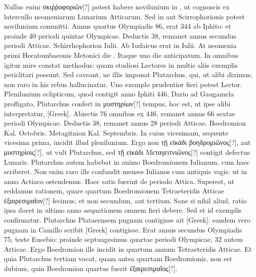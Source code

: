 Nullus enim \textgreek{σκιῤῥοφοριῶν[?]}
 potest habere novilunium in
, ut cognoscis ex latercullo neomeniarum Lunarium Atticarum.
Sed in  aut  Scirrophorionis potest
 novilunium committi.
Annus quartus Olympiadis 86, erat 344 ab Iphito: et proinde
40 periodi quintae Olympicae.
Deductis 38, remanet annus
secundus periodi Atticae.
Schirrhophorion  Iulii.
Ab Iudaicus
erat in  Iulii.
At neomenia primi Hecatombaeonis Metonici
die .
Itaque uno die anticipatum.
In omnibus igitur mire constat
methodus: quam studiosi Lectores in multis aliis exemplis periclitari
possunt.
Sed caveant, ne illis imponat Plutarchus, qui, ut alibi
diximus, non raro in his rebus hallucinatur.
Uno exemplo prudentior
fieri potest Lector.
Plenilunium eclipticum, quod contigit anno
Iphiti 446, Dario ad Gaugamela profligato, Plutarchus confert
in \textgreek{μυστηρίων[?]} tempus, hoc est, ut ipse alibi interpretatur,
 \textgreek{[Greek]}.
Abiectis 76 omnibus ex 446, remanet annus 66
sextae periodi Olympicae.
Deductis 38, remanet annus 28 periodi Atticae.
Boedromion Kal. Octobris.
Metagitnion Kal. Septembris.
In cuius
vicesimam, sequente vicesima prima, incidit illud plenilunium.
Ergo non \textgreek{τῇ εἰκάδι βοηδρομιῶνος[?]},
 aut \textgreek{μυστηρίοις[?]},
 ut vult Plutarchus, sed \textgreek{τῇ εἰκάδι Μεταγειτνιῶνος[?]}
contigit defectus Lunaris.
Plutarchus autem habebat
in animo Boedromionem Iulianum, cum haec scriberet.
Non
enim raro ille confundit menses Iulianos cum antiquis vagis: ut in anno
Actiaco ostendemus.
Haec satis fuerint de periodo Attica.
Superest,
ut reddamus rationem, quare quartum Boedromionem Tetraeteridis
Atticae \textgreek{ἐξαιρεσιμαῖον[?]} fecimus, et non secundum, aut tertium.
Sane si nihil aliud, ratio ipsa docet in ultimo anno aequationem
omnem fieri debere.
Sed et id exemplis confirmatur.
Plutarchus Plataeensem pugnam contigisse ait
 \textgreek{[Greek]}:
eandem vero pugnam in Camillo scribit \textgreek{[Greek]}
contigisse.
Erat annus secundus Olympiadis 75, teste
Eusebio: proinde septuagesimus quartae periodi Olympicae, 32
autem Atticae.
Ergo Boedromion ille incidit in quartum annum
Tetraeteridis Atticae.
Et quia Plutarchus tertiam vocat, quam
antea quartam Boedromionis, non est dubium, quin Boedromion
quartus fuerit \textgreek{ἐξαιρεσιμαῖος[?]}.

